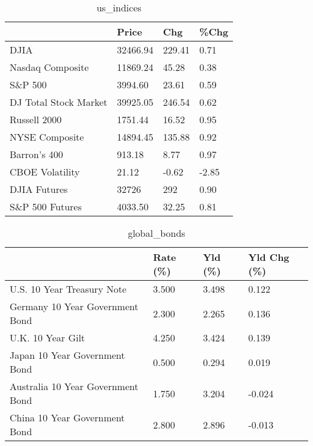 \documentclass{article}%
\begin{document}
%


\begin{table}[htbp]%
\caption{us\_indices}%
\centering%
\begin{adjustbox}{width=1\textwidth}%
\begin{tabular}{llll}
\toprule
                      &    Price &    Chg &  \%Chg \\
\midrule
                 DJIA & 32466.94 & 229.41 &  0.71 \\
     Nasdaq Composite & 11869.24 &  45.28 &  0.38 \\
              S\&P 500 &  3994.60 &  23.61 &  0.59 \\
DJ Total Stock Market & 39925.05 & 246.54 &  0.62 \\
         Russell 2000 &  1751.44 &  16.52 &  0.95 \\
       NYSE Composite & 14894.45 & 135.88 &  0.92 \\
         Barron's 400 &   913.18 &   8.77 &  0.97 \\
      CBOE Volatility &    21.12 &  -0.62 & -2.85 \\
         DJIA Futures &    32726 &    292 &  0.90 \\
      S\&P 500 Futures &  4033.50 &  32.25 &  0.81 \\
\bottomrule
\end{tabular}
%
\end{adjustbox}%
\end{table}

%


\begin{table}[htbp]%
\caption{global\_bonds}%
\centering%
\begin{adjustbox}{width=1\textwidth}%
\begin{tabular}{llll}
\toprule
                                  & Rate (\%) & Yld (\%) & Yld Chg (\%) \\
\midrule
       U.S. 10 Year Treasury Note &    3.500 &   3.498 &       0.122 \\
  Germany 10 Year Government Bond &    2.300 &   2.265 &       0.136 \\
                U.K. 10 Year Gilt &    4.250 &   3.424 &       0.139 \\
    Japan 10 Year Government Bond &    0.500 &   0.294 &       0.019 \\
Australia 10 Year Government Bond &    1.750 &   3.204 &      -0.024 \\
    China 10 Year Government Bond &    2.800 &   2.896 &      -0.013 \\
\bottomrule
\end{tabular}
%
\end{adjustbox}%
\end{table}
\end{document}
